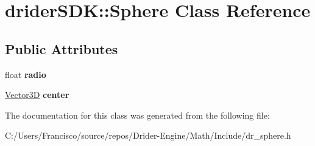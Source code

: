 \hypertarget{classdrider_s_d_k_1_1_sphere}{}\section{drider\+S\+DK\+:\+:Sphere Class Reference}
\label{classdrider_s_d_k_1_1_sphere}
\subsection*{Public Attributes}
\begin{DoxyCompactItemize}
\item 
\mbox{\label{classdrider_s_d_k_1_1_sphere_a6d5df7206f5fe0be846093b25b6544ff}} 
float {\bfseries radio}
\item 
\mbox{\label{classdrider_s_d_k_1_1_sphere_a89329d7317c107c9d5ecfd29914414bc}} 
\hyperlink{classdrider_s_d_k_1_1_vector3_d}{Vector3D} {\bfseries center}
\end{DoxyCompactItemize}


The documentation for this class was generated from the following file\+:\begin{DoxyCompactItemize}
\item 
C\+:/\+Users/\+Francisco/source/repos/\+Drider-\/\+Engine/\+Math/\+Include/dr\+\_\+sphere.\+h\end{DoxyCompactItemize}
